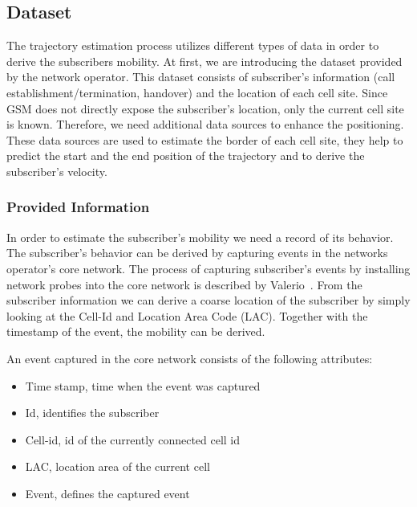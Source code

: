 \subsection{Dataset}
The trajectory estimation process utilizes different types of data in order to derive the subscribers mobility. At first, we are introducing the dataset provided by the network operator. This dataset consists of subscriber's information (call establishment/termination, handover) and the location of each cell site. Since GSM does not directly expose the subscriber's location, only the current cell site is known. Therefore, we need additional data sources to enhance the positioning. These data sources are used to estimate the border of each cell site, they help to predict the start and the end position of the trajectory and to derive the subscriber's velocity.
\subsubsection{Provided Information}
In order to estimate the subscriber's mobility we need a record of its behavior. The subscriber's behavior can be derived by capturing events in the networks operator's core network. The process of capturing subscriber's events by installing network probes into the core network is described by Valerio~\cite{RoadCell2009}. From the subscriber information we can derive a coarse location of the subscriber by simply looking at the Cell-Id and Location Area Code (LAC). Together with the timestamp of the event, the mobility can be derived.

An event captured in the core network consists of the following attributes:
\begin{itemize}
	\item Time stamp, time when the event was captured
	\item Id, identifies the subscriber
	\item Cell-id, id of the currently connected cell id
	\item LAC, location area of the current cell
	\item Event, defines the captured event
\end{itemize}

